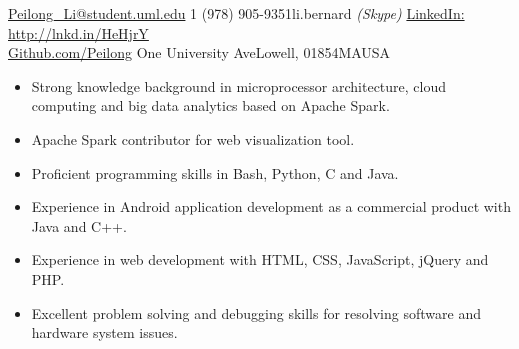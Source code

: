\documentclass[10pt,a4paper]{article} %
\begin{document}
 



\noindent\href{mailto:Peilong\_Li@student.uml.edu}{Peilong\_Li@student.uml.edu}\bull %
\textsmaller{+}1 (978) 905-9351\bull li.bernard \textit{(Skype)}\bull %
\href{http://www.linkedin.com/pub/peilong-li/55/a5/725}{LinkedIn: http://lnkd.in/HeHjrY}\\ %
\href{https://github.com/Peilong}{Github.com/Peilong} \bull
One University Ave\bull Lowell, 01854\bull MA\bull USA %

\spacedhrule{0.5em}{-0.4em} %




\begin{itemize}
  \item Strong knowledge background in microprocessor architecture, cloud computing and big data analytics based on Apache Spark.
  \item Apache Spark contributor for web visualization tool.
  \item Proficient programming skills in Bash, Python, C and Java.
  \item Experience in Android application development as a commercial product with Java and C++.
  \item Experience in web development with HTML, CSS, JavaScript, jQuery and PHP.
  \item Excellent problem solving and debugging skills for resolving software and hardware system issues.
\end{itemize}
\end{document}
